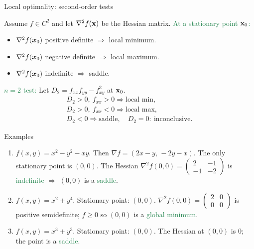 \documentclass{beamer}
\begin{document}
\begin{frame}{Local optimality: second-order tests}

Assume \(f\in C^2\) and let \(\nabla^2 f({\bf x})\) be the Hessian matrix.
\vskip 6pt
\textcolor{SeaGreen}{At a stationary point \({\bf x}_0\):}
\begin{itemize}
\item \(\nabla^2 f({\boldsymbol x_0})\) positive definite \(\Rightarrow\) local minimum.
\item \(\nabla^2 f({\boldsymbol x_0})\) negative definite \(\Rightarrow\) local maximum.
\item \(\nabla^2 f({\boldsymbol x_0})\) indefinite \(\Rightarrow\) saddle.
\end{itemize}
\vskip 6pt
\textcolor{SeaGreen}{\(n=2\) test:} Let \(D_2=f_{xx}f_{yy}-f_{xy}^2\) at \({\bf x}_0\).
\[
\begin{array}{l}
D_2>0,\ f_{xx}>0 \Rightarrow \text{local min},\\
D_2>0,\ f_{xx}<0 \Rightarrow \text{local max},\\
D_2<0 \Rightarrow \text{saddle},\quad D_2=0:\ \text{inconclusive}.
\end{array}
\]

\end{frame}

\begin{frame}{Examples}

\begin{enumerate}
\item \(f(x,y)=x^2-y^2-xy\). Then \(\nabla f=(2x-y,\,-2y-x)\). The only stationary point is \((0,0)\). The Hessian
\(
\nabla^2 f(0,0)=\begin{pmatrix}2&-1\\ -1&-2\end{pmatrix}
\)
is \textcolor{SeaGreen}{indefinite} \(\Rightarrow\) \((0,0)\) is a \textcolor{SeaGreen}{saddle}.
\item \(f(x,y)=x^2+y^4\). Stationary point: \((0,0)\). 
\(
\nabla^2 f(0,0)=\begin{pmatrix}2&0\\ 0&0\end{pmatrix}
\)
is positive semidefinite; \(f\ge 0\) so \((0,0)\) is a \textcolor{SeaGreen}{global minimum}.
\item \(f(x,y)=x^3+y^3\). Stationary point: \((0,0)\). The Hessian at \((0,0)\) is \(0\); the point is a \textcolor{SeaGreen}{saddle}.
\end{enumerate}

\end{frame}
\end{document}
